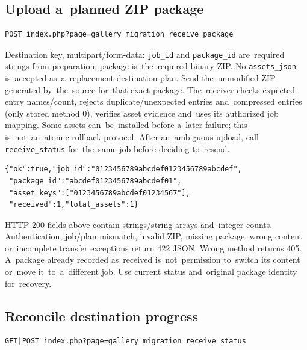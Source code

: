 \documentclass[11pt,a4paper]{article}
\newcommand{\codeword}[1]{\nolinkurl{#1}}
\begin{document}
\subsection{\texorpdfstring{Upload a~planned ZIP package}{Upload a planned ZIP package}}

\label{api352:migration-receive-package}

\begin{lstlisting}[language={}]
POST index.php?page=gallery_migration_receive_package
\end{lstlisting}

Destination key, multipart/form-data: \codeword{job_id} and \codeword{package_id}
are~required strings from preparation; package is~the~required binary ZIP. No
\codeword{assets_json} is~accepted as~a~replacement destination plan. Send the~unmodified
ZIP generated by~the~source for~that exact package. The~receiver checks expected entry
names/count, rejects duplicate/unexpected entries and~compressed entries (only stored method
0), verifies asset evidence and~uses its authorized job mapping. Some assets
can~be~installed before a~later failure; this is~not~an~atomic rollback protocol. After
an~ambiguous upload, call \codeword{receive_status} for~the~same job before deciding
to~resend.

\begin{lstlisting}[language={}]
{"ok":true,"job_id":"0123456789abcdef0123456789abcdef",
 "package_id":"abcdef0123456789abcdef01",
 "asset_keys":["0123456789abcdef01234567"],
 "received":1,"total_assets":1}
\end{lstlisting}

HTTP 200 fields above contain strings/string arrays and~integer counts. Authentication,
job/plan mismatch, invalid ZIP, missing package, wrong content or~incomplete transfer
exceptions return 422 JSON. Wrong method returns 405. A~package already recorded as~received
is~not~permission to~switch its content or~move it~to~a~different job. Use current status
and~original package identity for~recovery.

\subsection{\texorpdfstring{Reconcile destination progress}{Reconcile destination progress}}

\label{api352:migration-receive-status}

\begin{lstlisting}[language={}]
GET|POST index.php?page=gallery_migration_receive_status
\end{lstlisting}
\end{document}
